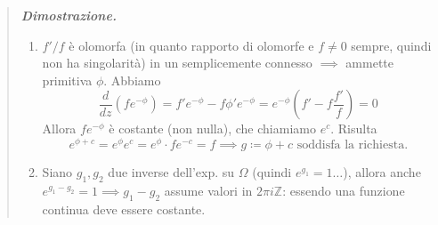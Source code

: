 \documentclass[a4paper,10pt]{article}
\theoremstyle{indentdefinition}
\theoremstyle{indenttheorem}
\theoremstyle{myremark}
\theoremstyle{indentgeneral}
\newenvironment{dimo}{\begin{quote}\textit{\textbf{Dimostrazione.}}}{\end{quote}} %
\begin{document}
\begin{dimo}
  \begin{enumerate}
      \item $f'/f$ è olomorfa (in quanto rapporto di olomorfe e $f\ne0$ sempre, quindi non ha singolarità) in un semplicemente connesso $\implies$ ammette primitiva $\phi$. Abbiamo
   $$\frac{d}{dz}(fe^{-\phi})=f'e^{-\phi}-f\phi'e^{-\phi}=e^{-\phi}(f'-f\frac{f'}{f})=0$$
   Allora $fe^{-\phi}$ è costante (non nulla), che chiamiamo $e^c$. Risulta
   $$e^{\phi+c}=e^\phi e^c=e^\phi \cdot fe^{-c}=f \implies g\coloneqq\phi+c \text{ soddisfa la richiesta.}$$
    \item Siano $g_1,g_2$ due inverse dell'exp. su $\Omega$ (quindi $e^{g_1}=1\dots$), allora anche $e^{g_1-g_2}=1\implies g_1-g_2$ assume valori in $2\pi i\mathbb{Z}$: essendo una funzione continua deve essere costante.
  \end{enumerate} 
\end{dimo}
\end{document}

